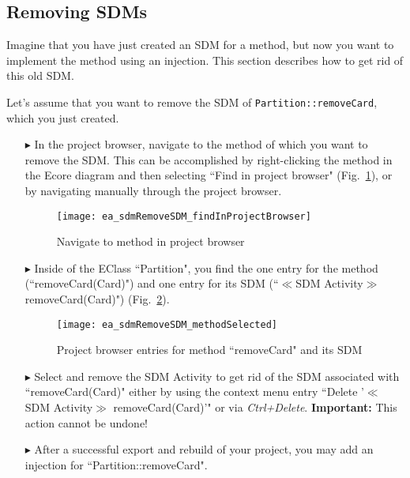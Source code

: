\subsection*{Removing SDMs}

Imagine that you have just created an SDM for a method, but now you want to implement the method using an injection.
This section describes how to get rid of this old SDM.

Let's assume that you want to remove the SDM of \texttt{Partition::removeCard}, which you just created.

\begin{itemize}
\item[$\blacktriangleright$]
In the project browser, navigate to the method of which you want to remove the SDM.
This can be accomplished by right-clicking the method in the Ecore diagram and then selecting ``Find in project browser" (Fig.~\ref{ea:sdm_removeSDM_findInProjectBrowser}), or by navigating manually through the project browser.

\begin{figure}[htbp]
    \begin{center}
        \texttt{[image: ea\_sdmRemoveSDM\_findInProjectBrowser]}
        \caption{Navigate to method in project browser}  
        \label{ea:sdm_removeSDM_findInProjectBrowser}
    \end{center}
\end{figure}

\item[$\blacktriangleright$]
Inside of the EClass ``Partition", you find the one entry for the method (``removeCard(Card)") and one entry for its SDM (``$\ll$SDM Activity$\gg$ removeCard(Card)") (Fig.~\ref{ea:sdm_removeSDM_methodSelected}).

\begin{figure}[htbp]
    \begin{center}
        \texttt{[image: ea\_sdmRemoveSDM\_methodSelected]}
        \caption{Project browser entries for method ``removeCard" and its SDM}  
        \label{ea:sdm_removeSDM_methodSelected}
    \end{center}
\end{figure}

\item[$\blacktriangleright$]
Select and remove the SDM Activity to get rid of the SDM associated with ``removeCard(Card)" either by using the context menu entry ``Delete '$\ll$SDM Activity$\gg$ removeCard(Card)'" or via \emph{Ctrl+Delete}.
\textbf{Important:} This action cannot be undone!

\item[$\blacktriangleright$]
After a successful export and rebuild of your project, you may add an injection for ``Partition::removeCard".

\end{itemize}